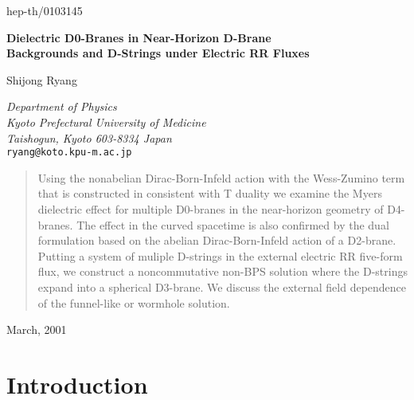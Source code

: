 \documentclass[12pt,a4paper]{article}
\begin{document}
\begin{flushright}
hep-th/0103145
\end{flushright}
\vspace{1.8cm}

\begin{center}
\textbf{\Large Dielectric D0-Branes in Near-Horizon D-Brane \\
  Backgrounds and D-Strings under Electric RR Fluxes}
\end{center}
\vspace{1.6cm}
\begin{center}
Shijong Ryang
\end{center}

\begin{center}
\textit{Department of Physics \\ Kyoto Prefectural University of
 Medicine \\ Taishogun, Kyoto 603-8334 Japan} \\
\texttt{ryang@koto.kpu-m.ac.jp}
\end{center}
\vspace{2.8cm}
\begin{abstract}
Using the nonabelian Dirac-Born-Infeld action with the Wess-Zumino term
that is constructed in consistent with T duality we examine the Myers
dielectric effect for multiple D0-branes in the near-horizon geometry of
D4-branes. The effect in the curved spacetime is also confirmed  by the
dual formulation based on the abelian Dirac-Born-Infeld action of
a D2-brane. Putting a system of muliple D-strings in 
the external electric RR five-form flux, we construct a noncommutative
non-BPS solution where the D-strings expand into a spherical D3-brane.
We discuss the external field dependence of the funnel-like 
or wormhole solution.
\end{abstract}
\vspace{3cm}
\begin{flushleft}
March, 2001
\end{flushleft}
\newpage
\section{Introduction}
\end{document}
